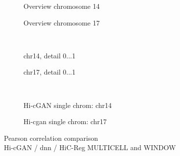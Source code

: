 \begin{figure}[htbp]
 \begin{subfigure}{0.45\textwidth}
  \caption{Overview chromosome 14}\label{fig:results:zhang-vs-ours_pearson_14overview}
 \end{subfigure}\hfill
\begin{subfigure}{0.45\textwidth}
  \caption{Overview chromosome 17}\label{fig:results:zhang-vs-ours_pearson_17overview}
 \end{subfigure}\\[4mm]
 \begin{subfigure}{0.45\textwidth}
  \caption{chr14, detail 0...\SI{1}{\mega\bp}}\label{fig:results:zhang-vs-ours_pearson_14detail}
 \end{subfigure}\hfill
 \begin{subfigure}{0.45\textwidth}
  \caption{chr17, detail 0...\SI{1}{\mega\bp}}\label{fig:results:zhang-vs-ours_pearson_17detail}
 \end{subfigure}\\[4mm]
 \begin{subfigure}{0.45\textwidth}
    \caption{Hi-cGAN single chrom: chr14}\label{fig:results:zhang-vs-ours_pearson_14singlechrom}
 \end{subfigure}\hfill
 \begin{subfigure}{0.45\textwidth}
    \caption{Hi-\acrshort{cgan} single chrom: chr17}\label{fig:results:zhang-vs-ours_pearson_17singlechrom}
 \end{subfigure}
  \caption[Pearson correlation comparison Hi-cGAN / \acrshort{dnn} / HiC-Reg MULTICELL and WINDOW \cite{Zhang2019}]{Pearson correlation comparison\\Hi-cGAN / \acrshort{dnn} / HiC-Reg MULTICELL and WINDOW \cite{Zhang2019}} \label{fig:results:zhang-vs-ours_pearson}
\end{figure}
